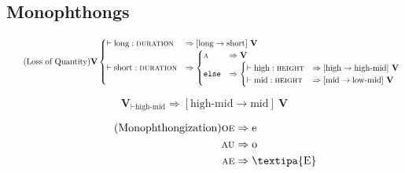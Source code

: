 \documentclass{report}
\begin{document}
\subsection{Monophthongs}

\begin{tcolorbox}[title=Proto-Romance Loss of Quantity]  
  \begin{equation}\tag{Loss of Quantity}\label{loss_of_quantity}
    \textbf{V}
    \begin{cases}
      \vdash \text{long} : \textsc{duration} & \Rightarrow [\text{long} \rightarrow \text{short}]\ \textbf{V} \\
      \vdash \text{short} : \textsc{duration} & \Rightarrow
                                                \begin{cases}
                                                  \textsc{a} & \Rightarrow \textbf{V} \\
                                                  \texttt{else} & \Rightarrow \begin{cases}
                                                                              \vdash \text{high} : \textsc{height} & \Rightarrow [\text{high} \rightarrow \text{high-mid}]\ \textbf{V} \\
                                                                              \vdash \text{mid} : \textsc{height} & \Rightarrow [\text{mid} \rightarrow \text{low-mid}]\ \textbf{V} \\
                                                                            \end{cases} \\
                                                \end{cases} \\
    \end{cases}
  \end{equation}  
\end{tcolorbox}

\begin{tcolorbox}[title=Pan-Romance Great Merger]
  \begin{equation}\tag{Great Merger}\label{eq:great_merger}
    \textbf{V}_{\vdash \text{high-mid}} \Rightarrow [\text{high-mid} \rightarrow \text{mid}]\ \textbf{V}
  \end{equation}
\end{tcolorbox}

\begin{tcolorbox}[title=Monophthongization]
  \begin{align*}\tag{Monophthongization}\label{eq:monophthongization}
    \textsc{oe} & \Rightarrow \text{e} \\
    \textsc{au} & \Rightarrow \text{o} \\
    \textsc{ae} & \Rightarrow \text{\textipa{E}} 
  \end{align*}
\end{tcolorbox}
\end{document}
